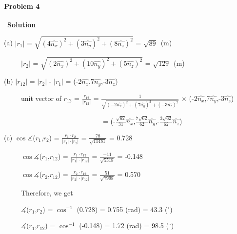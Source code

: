 \documentclass[12pt,a4paper]{article}
\begin{document}
\paragraph{\large \textbf{Problem 4}}~{\textbf{Solution}}
\vspace{2mm}
\par (a) $\lvert$\textbf{$r_1$}$\rvert$ = $\sqrt{(4\hat{n_x})^2 + (3\hat{n_y})^2 + (8\hat{n_z})^2}$ = $\sqrt{89}$\ (m)
\par \ \ \ \ \ $\lvert$\textbf{$r_2$}$\rvert$ = $\sqrt{(2\hat{n_x})^2 + (10\hat{n_y})^2 + (5\hat{n_z})^2}$ = $\sqrt{129}$\ (m)
\vspace{2mm}
\par (b) $\lvert$\textbf{$r_{12}$}$\rvert$ = $\lvert$\textbf{$r_2$}$\rvert$ - $\lvert$\textbf{$r_1$}$\rvert$ = (-2$\hat{n_x}$,7$\hat{n_y}$,-3$\hat{n_z}$)
\vspace{1mm}
\par \ \ \ \ \ unit vector of \textbf{$r_{12}$} = $\frac{\textbf{$r_{12}$}}{\lvert\textbf{$r_{12}$}\rvert}$ = $\frac{1}{\sqrt{(-2\hat{n_x})^2 + (7\hat{n_y})^2 + (-3\hat{n_z})^2}}$ $\times$ (-2$\hat{n_x}$,7$\hat{n_y}$,-3$\hat{n_z}$)
\par \ \ \ \ \ \ \ \ \ \ \ \ \ \ \ \ \ \ \ \ \ \ \ \ \ \ \ \ \ = (-$\frac{\sqrt{62}}{31}\hat{n_x}$,$\frac{7\sqrt{62}}{62}\hat{n_y}$,-$\frac{3\sqrt{62}}{62}\hat{n_z}$)
\vspace{2mm}
\par (c) $\cos \measuredangle$(\textbf{$r_1$},\textbf{$r_2$}) = $\frac{\textbf{$r_1$}\cdot\textbf{$r_2$}}{\lvert\textbf{$r_1$}\rvert \cdot \lvert\textbf{$r_2$}\rvert}$ = $\frac{78}{\sqrt{11481}}$ = 0.728
\par \ \ \ \ \ $\cos \measuredangle$(\textbf{$r_1$},\textbf{$r_{12}$}) = $\frac{\textbf{$r_1$}\cdot\textbf{$r_{12}$}}{\lvert\textbf{$r_1$}\rvert \cdot \lvert\textbf{$r_{12}$}\rvert}$ = $\frac{-11}{\sqrt{5518}}$ = -0.148
\par \ \ \ \ \ $\cos \measuredangle$(\textbf{$r_2$},\textbf{$r_{12}$}) = $\frac{\textbf{$r_2$}\cdot\textbf{$r_{12}$}}{\lvert\textbf{$r_2$}\rvert \cdot \lvert\textbf{$r_{12}$}\rvert}$ = $\frac{51}{\sqrt{7998}}$ = 0.570
\vspace{1mm}
\par \ \ \ \ \ Therefore, we get
\par \ \ \ \ \ $\measuredangle$(\textbf{$r_1$},\textbf{$r_2$}) = $\cos^{-1}$ (0.728) = 0.755 (rad) = 43.3 ($^\circ$)
\par \ \ \ \ \ $\measuredangle$(\textbf{$r_1$},\textbf{$r_{12}$}) = $\cos^{-1}$ (-0.148) = 1.72 (rad) = 98.5 ($^\circ$)
\end{document}

